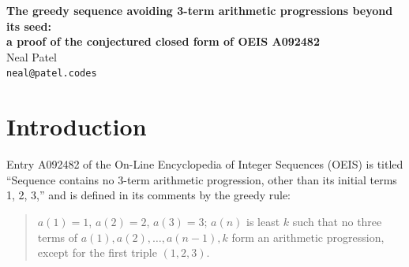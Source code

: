 \documentclass[12pt]{article}
\theoremstyle{plain}
\theoremstyle{definition}
\theoremstyle{remark}
\begin{document}
\begin{center}
{\LARGE\bf The greedy sequence avoiding 3-term arithmetic
progressions beyond its seed:\\[2mm] a proof of the conjectured
closed form of OEIS A092482}\\[8mm]
{\large Neal Patel}\\[1mm]
\texttt{neal@patel.codes}
\end{center}

\vskip 0.2in

\begin{abstract}
Sequence A092482 of the On-Line Encyclopedia of Integer Sequences
is the increasing sequence obtained greedily from $a(1)=1$,
$a(2)=2$, $a(3)=3$ by always appending the least integer that
creates no $3$-term arithmetic progression other than the initial
triple $(1,2,3)$.  The entry conjectures a closed form, recorded
there as ``conjectured and checked up to $n=512$.''  We prove it:
for $n\geq 1$,
$a(n+2)=1+2^{\lfloor\log_2 n\rfloor}+s(n)$, where $s(n)$ is the
value of the binary expansion of $n$ read in base $3$ (sequence
A005836).  The term set decomposes into blocks, each a translate
of an initial segment of the Stanley sequence A003278, and the
proof is the classical base-$2$/base-$3$ greedy argument applied
blockwise; the single new ingredient is a numerical coincidence
that makes each greedy jump land exactly at the start of the next
block.  Despite its seed, the sequence is not a Stanley sequence
in the sense of Odlyzko--Stanley, and it lies outside the
classification framework of Rolnick and Moy--Rolnick.  The proof
has been formalized and machine-checked in Lean~4 over Mathlib.
\end{abstract}

\section{Introduction}\label{sec:intro}

Entry A092482 of the On-Line Encyclopedia of Integer Sequences
(OEIS) \cite{OEIS} is titled ``Sequence contains no 3-term
arithmetic progression, other than its initial terms 1, 2, 3,''
and is defined in its comments by the greedy rule:

\begin{quote}
$a(1)=1$, $a(2)=2$, $a(3)=3$; $a(n)$ is least $k$ such that no
three terms of $a(1), a(2), \ldots, a(n-1), k$ form an arithmetic
progression, except for the first triple $(1,2,3)$.
\end{quote}
\end{document}
